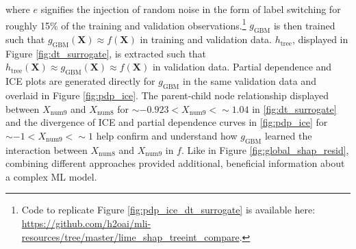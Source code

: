 \documentclass[fleqn]{article}
\begin{document}
\noindent where $e$ signifies the injection of random noise in the form of label switching for roughly 15\% of the training and validation observations.\footnote{Code to replicate Figure \ref{fig:pdp_ice_dt_surrogate} is available here: \url{https://github.com/h2oai/mli-resources/tree/master/lime_shap_treeint_compare}.} $g_{\text{GBM}}$ is then trained such that $g_{\text{GBM}}(\mathbf{X}) \approx f(\mathbf{X})$ in training and validation data. $h_{\text{tree}}$, displayed in Figure \ref{fig:dt_surrogate}, is extracted such that $h_{\text{tree}}(\mathbf{X}) \approx g_{\text{GBM}}(\mathbf{X}) \approx f(\mathbf{X})$ in validation data. Partial dependence and ICE plots are generated directly for $g_{\text{GBM}}$ in the same validation data and overlaid in Figure \ref{fig:pdp_ice}. The parent-child node relationship displayed between $X_{\text{num9}}$ and $X_{\text{num8}}$ for $\sim -0.923 < X_{\text{num9}} <  \sim 1.04$ in \ref{fig:dt_surrogate} and the divergence of ICE and partial dependence curves in \ref{fig:pdp_ice} for $\sim -1 < X_{\text{num9}} <  \sim 1$ help confirm and understand how $g_{\text{GBM}}$ learned the interaction between $X_{\text{num}8}$ and $X_{\text{num}9}$ in $f$. Like in Figure \ref{fig:global_shap_resid}, combining different approaches provided additional, beneficial information about a complex ML model. %

\end{document}
